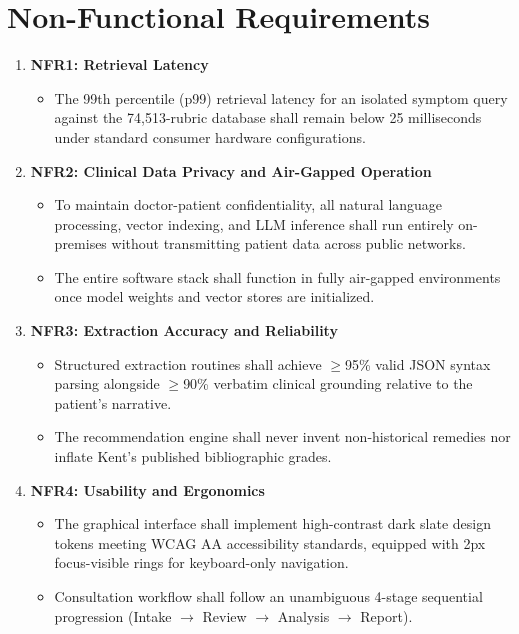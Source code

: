 
\section{Non-Functional Requirements}

\begin{enumerate}
  \item \textbf{NFR1: Retrieval Latency}
  \begin{itemize}
    \item The 99th percentile (p99) retrieval latency for an isolated symptom query against the 74,513-rubric database shall remain below 25 milliseconds under standard consumer hardware configurations.
  \end{itemize}

  \item \textbf{NFR2: Clinical Data Privacy and Air-Gapped Operation}
  \begin{itemize}
    \item To maintain doctor-patient confidentiality, all natural language processing, vector indexing, and LLM inference shall run entirely on-premises without transmitting patient data across public networks.
    \item The entire software stack shall function in fully air-gapped environments once model weights and vector stores are initialized.
  \end{itemize}

  \item \textbf{NFR3: Extraction Accuracy and Reliability}
  \begin{itemize}
    \item Structured extraction routines shall achieve $\geq$95\% valid JSON syntax parsing alongside $\geq$90\% verbatim clinical grounding relative to the patient's narrative.
    \item The recommendation engine shall never invent non-historical remedies nor inflate Kent's published bibliographic grades.
  \end{itemize}

  \item \textbf{NFR4: Usability and Ergonomics}
  \begin{itemize}
    \item The graphical interface shall implement high-contrast dark slate design tokens meeting WCAG AA accessibility standards, equipped with 2px focus-visible rings for keyboard-only navigation.
    \item Consultation workflow shall follow an unambiguous 4-stage sequential progression (Intake $\to$ Review $\to$ Analysis $\to$ Report).
  \end{itemize}


\end{enumerate}
